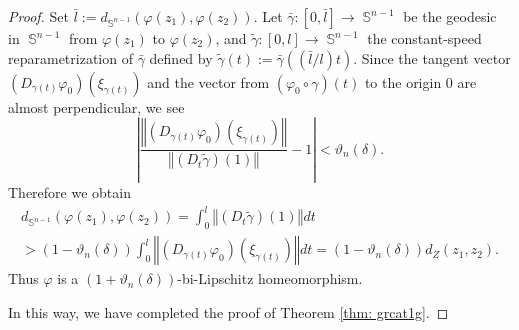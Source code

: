 \documentclass[10pt,a4paper]{amsart}
\newcommand{\Sph}{\operatorname{\mathbb{S}}}
\begin{document}
\begin{proof}
Set $\bar{l} := d_{\Sph^{n-1}} \left( \varphi(z_1), \varphi(z_2) \right)$.
Let $\bar{\gamma} \colon [0,\bar{l}] \to \Sph^{n-1}$ be 
the geodesic in $\Sph^{n-1}$
from $\varphi(z_1)$ to $\varphi(z_2)$, and
$\tilde{\gamma} \colon [0,l] \to \Sph^{n-1}$
the constant-speed reparametrization 
of $\bar{\gamma}$ defined by 
$\tilde{\gamma}(t) := \bar{\gamma} \left( (\bar{l}/l)t \right)$.
Since the tangent vector 
$\left( D_{\gamma(t)} \varphi_0 \right) \left( \xi_{\gamma(t)} \right)$
and the vector from $(\varphi_0 \circ \gamma)(t)$ to the origin $0$
are almost perpendicular,
we see
\[
\left\vert
\frac
{\left\Vert \left( D_{\gamma(t)} \varphi_0 \right) 
\left( \xi_{\gamma(t)} \right) \right\Vert}
{\left\Vert \left( D_t\tilde{\gamma} \right) (1) \right\Vert}
-1
\right\vert < \vartheta_n(\delta).
\]
Therefore we obtain
\begin{multline*}
d_{\Sph^{n-1}} \left( \varphi(z_1), \varphi(z_2) \right)
= \int_0^l \left\Vert \left( D_t\tilde{\gamma} \right) (1) \right\Vert dt \\
> \left( 1-\vartheta_n(\delta) \right) 
\int_0^l \left\Vert \left( D_{\gamma(t)} \varphi_0 \right) 
\left( \xi_{\gamma(t)} \right) \right\Vert dt
= \left( 1-\vartheta_n(\delta) \right) d_Z(z_1,z_2).
\end{multline*}
Thus $\varphi$ is a 
$\left( 1+\vartheta_n(\delta) \right)$-bi-Lipschitz homeomorphism.

In this way, 
we have completed the proof of Theorem \ref{thm: grcat1g}.
\end{proof}
\end{document}
